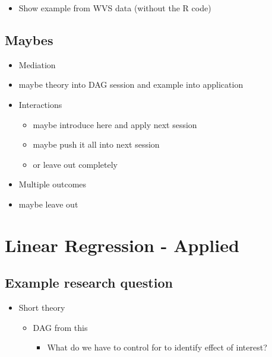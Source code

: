 \documentclass[
]{book}
\providecommand{\tightlist}{%
  \setlength{\itemsep}{0pt}\setlength{\parskip}{0pt}}
\begin{document}
\begin{itemize}
\tightlist
\item
  Show example from WVS data (without the R code)
\end{itemize}

\hypertarget{maybes}{%
\section{Maybes}\label{maybes}}

\begin{itemize}
\tightlist
\item
  Mediation
\item
  maybe theory into DAG session and example into application
\item
  Interactions

  \begin{itemize}
  \tightlist
  \item
    maybe introduce here and apply next session
  \item
    maybe push it all into next session
  \item
    or leave out completely
  \end{itemize}
\item
  Multiple outcomes
\item
  maybe leave out
\end{itemize}

\hypertarget{lin-a}{%
\chapter{Linear Regression - Applied}\label{lin-a}}

\hypertarget{example-research-question}{%
\section{Example research question}\label{example-research-question}}

\begin{itemize}
\tightlist
\item
  Short theory

  \begin{itemize}
  \tightlist
  \item
    DAG from this

    \begin{itemize}
    \tightlist
    \item
      What do we have to control for to identify effect of interest?
    \end{itemize}
  \end{itemize}
\end{itemize}
\end{document}

